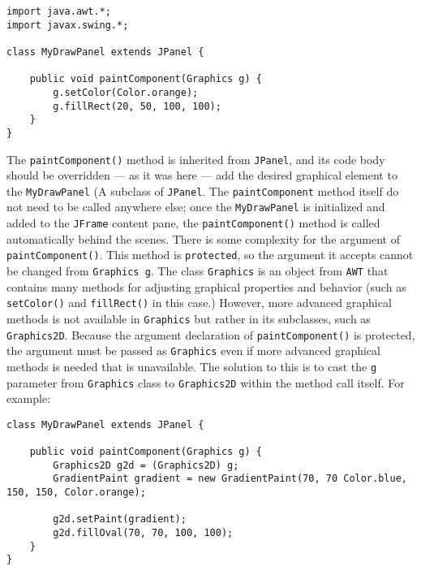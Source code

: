 \documentclass{tufte-handout}
\begin{document}
    \begin{lstlisting}
import java.awt.*;
import javax.swing.*;

class MyDrawPanel extends JPanel {
    
    public void paintComponent(Graphics g) {
        g.setColor(Color.orange);
        g.fillRect(20, 50, 100, 100);
    }
}
    \end{lstlisting}

    The \texttt{paintComponent()} method is inherited from \texttt{JPanel}, and its code body should be overridden --- as it was here --- add the desired graphical element to the \texttt{MyDrawPanel} (A subclass of \texttt{JPanel}. The \texttt{paintComponent} method itself do not need to be called anywhere else; once the \texttt{MyDrawPanel} is initialized and added to the \texttt{JFrame} content pane, the \texttt{paintComponent()} method is called automatically behind the scenes. There is some complexity for the argument of \texttt{paintComponent()}. This method is \texttt{protected}, so the argument it accepts cannot be changed from \texttt{Graphics g}. The class \texttt{Graphics} is an object from \texttt{AWT} that contains many methods for adjusting graphical properties and behavior (such as \texttt{setColor()} and \texttt{fillRect()} in this case.) However, more advanced graphical methods is not available in \texttt{Graphics} but rather in its subclasses, such as \texttt{Graphics2D}. Because the argument declaration of \texttt{paintComponent()} is protected, the argument must be passed as \texttt{Graphics} even if more advanced graphical methods is needed that is unavailable. The solution to this is to cast the \texttt{g} parameter from \texttt{Graphics} class to \texttt{Graphics2D} within the method call itself. For example:

    \begin{lstlisting}
class MyDrawPanel extends JPanel {
    
    public void paintComponent(Graphics g) {
        Graphics2D g2d = (Graphics2D) g;
        GradientPaint gradient = new GradientPaint(70, 70 Color.blue, 150, 150, Color.orange);

        g2d.setPaint(gradient);
        g2d.fillOval(70, 70, 100, 100);
    }
}
    \end{lstlisting}
\end{document}
